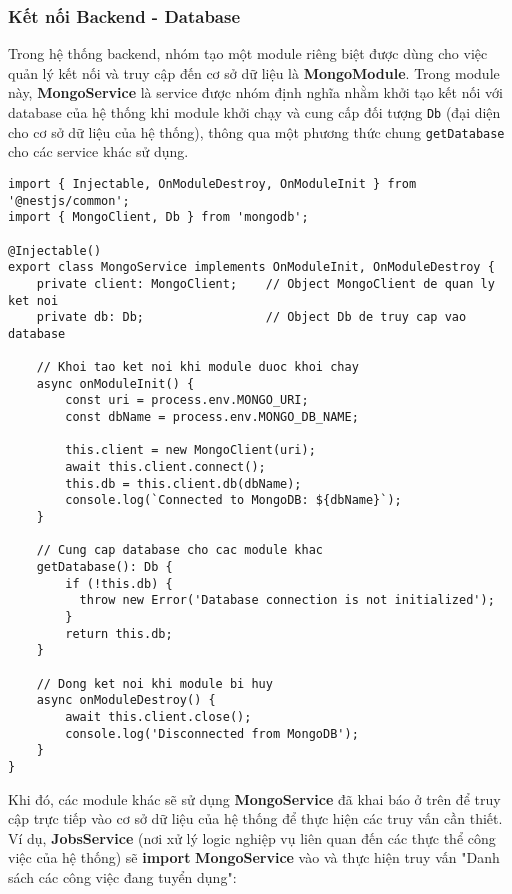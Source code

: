 \subsubsection{Kết nối Backend - Database}

Trong hệ thống backend, nhóm tạo một module riêng biệt được dùng cho việc quản lý kết nối và truy cập đến cơ sở dữ liệu là \textbf{MongoModule}. Trong module này, \textbf{MongoService} là service được nhóm định nghĩa nhằm khởi tạo kết nối với database của hệ thống khi module khởi chạy và cung cấp đối tượng \texttt{Db} (đại diện cho cơ sở dữ liệu của hệ thống), thông qua một phương thức chung \texttt{getDatabase} cho các service khác sử dụng.

\begin{lstlisting}
import { Injectable, OnModuleDestroy, OnModuleInit } from '@nestjs/common';
import { MongoClient, Db } from 'mongodb';

@Injectable()
export class MongoService implements OnModuleInit, OnModuleDestroy {
    private client: MongoClient;    // Object MongoClient de quan ly ket noi
    private db: Db;                 // Object Db de truy cap vao database

    // Khoi tao ket noi khi module duoc khoi chay
    async onModuleInit() {
        const uri = process.env.MONGO_URI;
        const dbName = process.env.MONGO_DB_NAME;
        
        this.client = new MongoClient(uri);
        await this.client.connect();
        this.db = this.client.db(dbName);
        console.log(`Connected to MongoDB: ${dbName}`);
    }

    // Cung cap database cho cac module khac
    getDatabase(): Db {
        if (!this.db) {
          throw new Error('Database connection is not initialized');
        }
        return this.db;
    }

    // Dong ket noi khi module bi huy
    async onModuleDestroy() {
        await this.client.close();
        console.log('Disconnected from MongoDB');
    }
}
\end{lstlisting}

Khi đó, các module khác sẽ sử dụng \textbf{MongoService} đã khai báo ở trên để truy cập trực tiếp vào cơ sở dữ liệu của hệ thống để thực hiện các truy vấn cần thiết. Ví dụ, \textbf{JobsService} (nơi xử lý logic nghiệp vụ liên quan đến các thực thể công việc của hệ thống) sẽ \textbf{import} \textbf{MongoService} vào và thực hiện truy vấn "Danh sách các công việc đang tuyển dụng":

